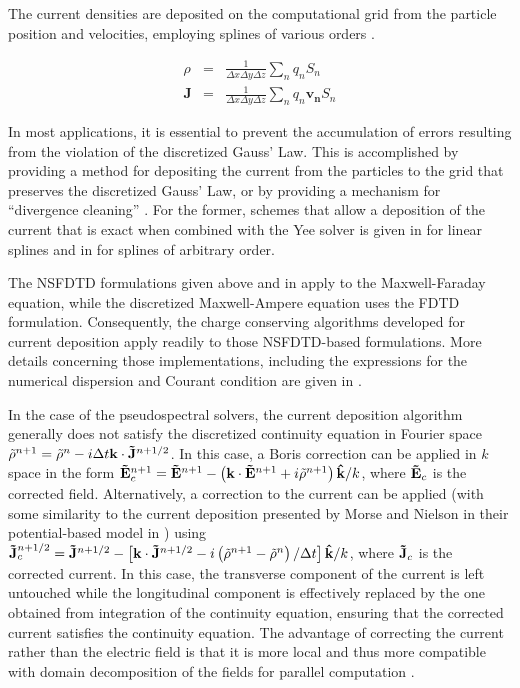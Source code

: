 

The current densities are deposited on the computational grid from
the particle position and velocities, employing splines of various
orders \cite{Abejcp86}.

\begin{subequations}
\begin{eqnarray}
\rho & = & \frac{1}{\Delta x \Delta y \Delta z}\sum_nq_nS_n\\
\mathbf{J} & = & \frac{1}{\Delta x \Delta y \Delta z}\sum_nq_n\mathbf{v_n}S_n
\end{eqnarray}
\end{subequations}

In most applications, it is essential to prevent the accumulation
of errors resulting from the violation of the discretized Gauss' Law.
This is accomplished by providing a method for depositing the current
from the particles to the grid that preserves the discretized Gauss'
Law, or by providing a mechanism for ``divergence cleaning'' \cite{Birdsalllangdon,Langdoncpc92,Marderjcp87,Vaypop98,Munzjcp2000}.
For the former, schemes that allow a deposition of the current that
is exact when combined with the Yee solver is given in \cite{Villasenorcpc92}
for linear splines and in \cite{Esirkepovcpc01} for splines of arbitrary order. 

The NSFDTD formulations given above and in \cite{PukhovJPP99,Vayjcp2011,CowanPRSTAB13,LehePRSTAB13} 
apply to the Maxwell-Faraday
equation, while the discretized Maxwell-Ampere equation uses the FDTD
formulation. Consequently, the charge conserving algorithms developed
for current deposition \cite{Villasenorcpc92,Esirkepovcpc01} apply
readily to those NSFDTD-based formulations. More details concerning
those implementations, including the expressions for the numerical
dispersion and Courant condition are given 
in \cite{PukhovJPP99,Vayjcp2011,CowanPRSTAB13,LehePRSTAB13}. 

In the case of the pseudospectral solvers, the current deposition
algorithm generally does not satisfy the discretized continuity equation
in Fourier space $\tilde{\rho}^{n+1}=\tilde{\rho}^{n}-i\Delta t\mathbf{k}\cdot\mathbf{\tilde{J}}^{n+1/2}$.
In this case, a Boris correction \cite{Birdsalllangdon} can be applied
in $k$ space in the form $\mathbf{\tilde{E}}_{c}^{n+1}=\mathbf{\tilde{E}}^{n+1}-\left(\mathbf{k}\cdot\mathbf{\tilde{E}}^{n+1}+i\tilde{\rho}^{n+1}\right)\mathbf{\hat{k}}/k$,
where $\mathbf{\tilde{E}}_{c}$ is the corrected field. Alternatively, a correction
to the current can be applied (with some similarity to the current
deposition presented by Morse and Nielson in their potential-based
model in \cite{Morsenielson1971}) using $\mathbf{\tilde{J}}_{c}^{n+1/2}=\mathbf{\tilde{J}}^{n+1/2}-\left[\mathbf{k}\cdot\mathbf{\tilde{J}}^{n+1/2}-i\left(\tilde{\rho}^{n+1}-\tilde{\rho}^{n}\right)/\Delta t\right]\mathbf{\hat{k}}/k$,
where $\mathbf{\tilde{J}}_{c}$ is the corrected current. In this case, the transverse
component of the current is left untouched while the longitudinal
component is effectively replaced by the one obtained from integration
of the continuity equation, ensuring that the corrected current satisfies
the continuity equation. The advantage of correcting the current rather than 
the electric field is that it is more local and thus more compatible with 
domain decomposition of the fields for parallel computation \cite{VayJCP2013}.

